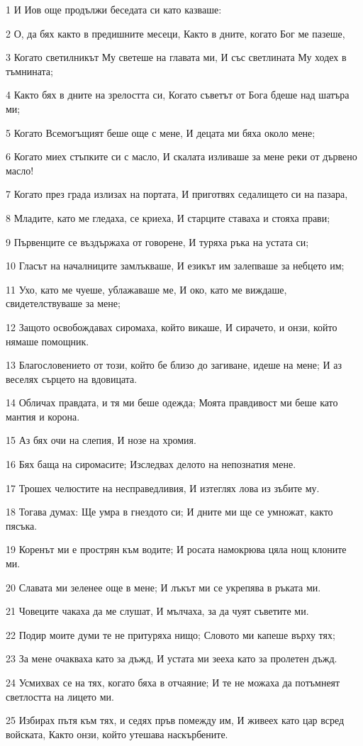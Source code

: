 \par 1 И Иов още продължи беседата си като казваше:
\par 2 О, да бях както в предишните месеци, Както в дните, когато Бог ме пазеше,
\par 3 Когато светилникът Му светеше на главата ми, И със светлината Му ходех в тъмнината;
\par 4 Както бях в дните на зрелостта си, Когато съветът от Бога бдеше над шатъра ми;
\par 5 Когато Всемогъщият беше още с мене, И децата ми бяха около мене;
\par 6 Когато миех стъпките си с масло, И скалата изливаше за мене реки от дървено масло!
\par 7 Когато през града излизах на портата, И приготвях седалището си на пазара,
\par 8 Младите, като ме гледаха, се криеха, И старците ставаха и стояха прави;
\par 9 Първенците се въздържаха от говорене, И туряха ръка на устата си;
\par 10 Гласът на началниците замлъкваше, И езикът им залепваше за небцето им;
\par 11 Ухо, като ме чуеше, ублажаваше ме, И око, като ме виждаше, свидетелствуваше за мене;
\par 12 Защото освобождавах сиромаха, който викаше, И сирачето, и онзи, който нямаше помощник.
\par 13 Благословението от този, който бе близо до загиване, идеше на мене; И аз веселях сърцето на вдовицата.
\par 14 Обличах правдата, и тя ми беше одежда; Моята правдивост ми беше като мантия и корона.
\par 15 Аз бях очи на слепия, И нозе на хромия.
\par 16 Бях баща на сиромасите; Изследвах делото на непознатия мене.
\par 17 Трошех челюстите на несправедливия, И изтеглях лова из зъбите му.
\par 18 Тогава думах: Ще умра в гнездото си; И дните ми ще се умножат, както пясъка.
\par 19 Коренът ми е прострян към водите; И росата намокрюва цяла нощ клоните ми.
\par 20 Славата ми зеленее още в мене; И лъкът ми се укрепява в ръката ми.
\par 21 Човеците чакаха да ме слушат, И мълчаха, за да чуят съветите ми.
\par 22 Подир моите думи те не притуряха нищо; Словото ми капеше върху тях;
\par 23 За мене очакваха като за дъжд, И устата ми зееха като за пролетен дъжд.
\par 24 Усмихвах се на тях, когато бяха в отчаяние; И те не можаха да потъмнеят светлостта на лицето ми.
\par 25 Избирах пътя към тях, и седях пръв помежду им, И живеех като цар всред войската, Както онзи, който утешава наскърбените.

